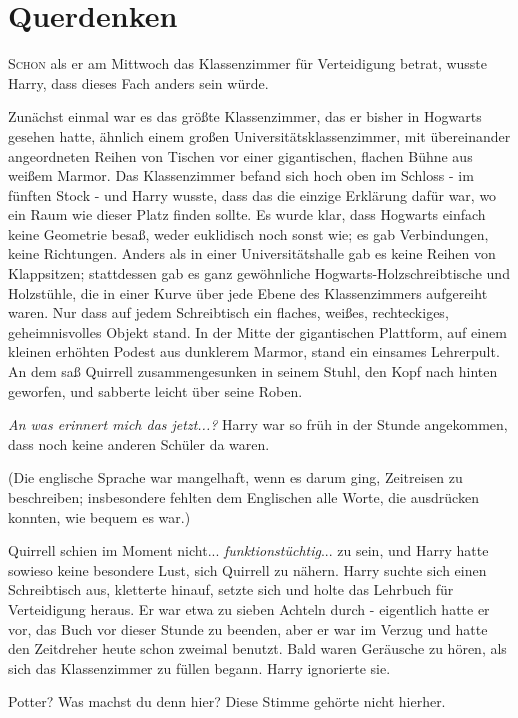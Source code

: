 \chapter{Querdenken}

\lettrine{S}{chon} als er am Mittwoch das Klassenzimmer für Verteidigung betrat,
wusste Harry, dass dieses Fach anders sein würde.

Zunächst einmal war es das größte Klassenzimmer, das er bisher in Hogwarts
gesehen hatte, ähnlich einem großen Universitätsklassenzimmer, mit übereinander
angeordneten Reihen von Tischen vor einer gigantischen, flachen Bühne aus weißem
Marmor. Das Klassenzimmer befand sich hoch oben im Schloss - im fünften Stock -
und Harry wusste, dass das die einzige Erklärung dafür war, wo ein Raum wie
dieser Platz finden sollte. Es wurde klar, dass Hogwarts einfach keine Geometrie
besaß, weder euklidisch noch sonst wie; es gab Verbindungen, keine Richtungen.
Anders als in einer Universitätshalle gab es keine Reihen von Klappsitzen;
stattdessen gab es ganz gewöhnliche Hogwarts-Holzschreibtische und Holzstühle,
die in einer Kurve über jede Ebene des Klassenzimmers aufgereiht waren. Nur dass
auf jedem Schreibtisch ein flaches, weißes, rechteckiges, geheimnisvolles Objekt
stand. In der Mitte der gigantischen Plattform, auf einem kleinen erhöhten
Podest aus dunklerem Marmor, stand ein einsames Lehrerpult. An dem saß Quirrell
zusammengesunken in seinem Stuhl, den Kopf nach hinten geworfen, und sabberte
leicht über seine Roben.

\emph{An was erinnert mich das jetzt...?} Harry war so früh in der Stunde
angekommen, dass noch keine anderen Schüler da waren.

(Die englische Sprache war mangelhaft, wenn es darum ging, Zeitreisen zu
beschreiben; insbesondere fehlten dem Englischen alle Worte, die ausdrücken
konnten, wie bequem es war.)

Quirrell schien im Moment nicht... \emph{funktionstüchtig}... zu sein, und Harry
hatte sowieso keine besondere Lust, sich Quirrell zu nähern. Harry suchte sich
einen Schreibtisch aus, kletterte hinauf, setzte sich und holte das Lehrbuch für
Verteidigung heraus. Er war etwa zu sieben Achteln durch - eigentlich hatte er
vor, das Buch vor dieser Stunde zu beenden, aber er war im Verzug und hatte den
Zeitdreher heute schon zweimal benutzt. Bald waren Geräusche zu hören, als sich
das Klassenzimmer zu füllen begann. Harry ignorierte sie.

\glqq{}Potter? Was machst du denn hier?\grqq{} Diese Stimme gehörte nicht
hierher.

